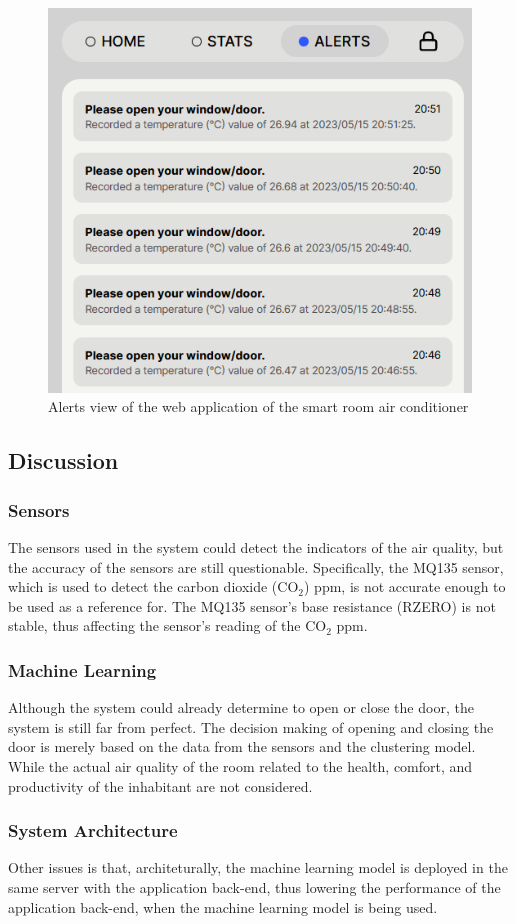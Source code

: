 \begin{figure}
      \centerline{\includegraphics[scale=0.5]{resources/webapp-alerts-view.png}}
      \caption{Alerts view of the web application of the smart room air conditioner}
      \label{webapp-alerts-view}
\end{figure}

\subsection{Discussion}
\subsubsection{Sensors}
The sensors used in the system could detect the
indicators of the air quality, but the accuracy
of the sensors are still questionable.
Specifically, the MQ135 sensor, which is used to
detect the carbon dioxide (CO$_2$) ppm, is not
accurate enough to be used as a reference for.
The MQ135 sensor's base resistance (RZERO) is
not stable, thus affecting the sensor's
reading of the CO$_2$ ppm.

\subsubsection{Machine Learning}
Although the system could already determine to open
or close the door, the system is still far from
perfect. The decision making of opening and closing
the door is merely based on the data from the
sensors and the clustering model. While the actual
air quality of the room related to the health,
comfort, and productivity of the inhabitant are not
considered.

\subsubsection{System Architecture}
Other issues is that, architeturally, the machine
learning model is deployed in the same server with
the application back-end, thus lowering the
performance of the application back-end, when the
machine learning model is being used.
